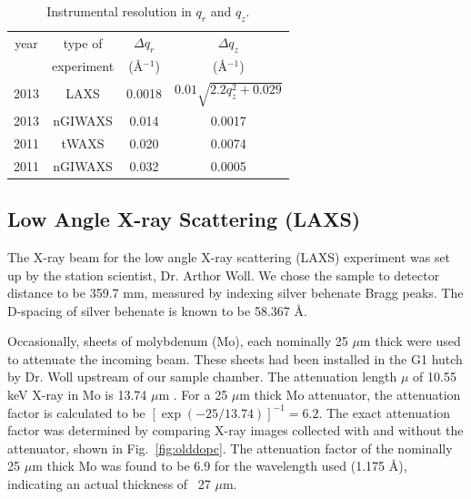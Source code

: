 \begin{table}[htbp]
  \centering
  \begin{tabular}{cccc}
    \hline
    year & type of  & $\Delta q_r$ & $\Delta q_z$ \\
       & experiment & (\AA$^{-1}$) & (\AA$^{-1}$) \\
    \hline
    2013 & LAXS    & 0.0018 & $0.01\sqrt{2.2q_z^2+0.029}$ \\
    2013 & nGIWAXS & 0.014 & 0.0017 \\
    2011 & tWAXS   & 0.020 & 0.0074 \\
    2011 & nGIWAXS & 0.032 & 0.0005\\ 
    \hline  
  \end{tabular}
  \caption[Instrumental resolution in $q_r$ and $q_z$]
  {Instrumental resolution in $q_r$ and $q_z$.}
  \label{tab:instrumental_resolution}
\end{table}


\newpage
\subsection{Low Angle X-ray Scattering (LAXS)}\label{sec:LAXS_method}
The X-ray beam for the low angle X-ray scattering (LAXS) experiment 
was set up by the station scientist, Dr. Arthor Woll.
We chose the sample to detector distance to be 359.7 mm, measured by indexing
silver behenate Bragg peaks. The D-spacing of silver behenate is known to be
58.367 \AA.

Occasionally, sheets of molybdenum (Mo), each nominally 25 $\mu$m 
thick were 
used to attenuate the incoming beam. 
These sheets had been installed in the G1 hutch by Dr. Woll upstream of our 
sample chamber.
The attenuation length $\mu$ of 10.55 keV X-ray in Mo is 13.74 $\mu$m \cite{ref:cxro}.
For a 25 $\mu$m thick Mo attenuator, the attenuation factor is calculated to be
$[\exp(-25/13.74)]^{-1} = 6.2$. The exact attenuation factor was determined
by comparing X-ray images collected with and without the attenuator, 
shown in Fig.~\ref{fig:olddopc}.
The attenuation factor of the nominally 25 $\mu$m thick Mo was found to 
be 6.9 for the wavelength used (1.175 \AA), indicating an actual thickness
of ~27 $\mu$m. 

